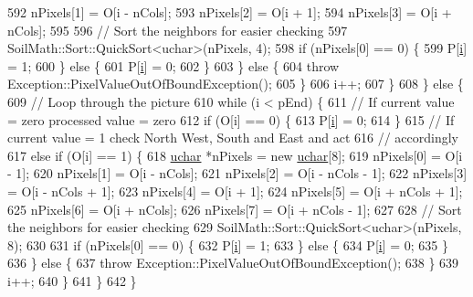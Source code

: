 \begin{DoxyCode}
592         nPixels[1] = O[i - nCols];
593         nPixels[2] = O[i + 1];
594         nPixels[3] = O[i + nCols];
595 
596         \textcolor{comment}{// Sort the neighbors for easier checking}
597         SoilMath::Sort::QuickSort<uchar>(nPixels, 4);
598         \textcolor{keywordflow}{if} (nPixels[0] == 0) \{
599           P[\hyperlink{_comparision_pictures_2_createtest_image_8m_a6f6ccfcf58b31cb6412107d9d5281426}{i}] = 1;
600         \} \textcolor{keywordflow}{else} \{
601           P[\hyperlink{_comparision_pictures_2_createtest_image_8m_a6f6ccfcf58b31cb6412107d9d5281426}{i}] = 0;
602         \}
603       \} \textcolor{keywordflow}{else} \{
604         \textcolor{keywordflow}{throw} Exception::PixelValueOutOfBoundException();
605       \}
606       i++;
607     \}
608   \} \textcolor{keywordflow}{else} \{
609     \textcolor{comment}{// Loop through the picture}
610     \textcolor{keywordflow}{while} (i < pEnd) \{
611       \textcolor{comment}{// If current value = zero processed value = zero}
612       \textcolor{keywordflow}{if} (O[i] == 0) \{
613         P[\hyperlink{_comparision_pictures_2_createtest_image_8m_a6f6ccfcf58b31cb6412107d9d5281426}{i}] = 0;
614       \}
615       \textcolor{comment}{// If current value = 1 check North West, South and East and act}
616       \textcolor{comment}{// accordingly}
617       \textcolor{keywordflow}{else} \textcolor{keywordflow}{if} (O[i] == 1) \{
618         \hyperlink{_soil_math_types_8h_a65f85814a8290f9797005d3b28e7e5fc}{uchar} *nPixels = \textcolor{keyword}{new} \hyperlink{_soil_math_types_8h_a65f85814a8290f9797005d3b28e7e5fc}{uchar}[8];
619         nPixels[0] = O[i - 1];
620         nPixels[1] = O[i - nCols];
621         nPixels[2] = O[i - nCols - 1];
622         nPixels[3] = O[i - nCols + 1];
623         nPixels[4] = O[i + 1];
624         nPixels[5] = O[i + nCols + 1];
625         nPixels[6] = O[i + nCols];
626         nPixels[7] = O[i + nCols - 1];
627 
628         \textcolor{comment}{// Sort the neighbors for easier checking}
629         SoilMath::Sort::QuickSort<uchar>(nPixels, 8);
630 
631         \textcolor{keywordflow}{if} (nPixels[0] == 0) \{
632           P[\hyperlink{_comparision_pictures_2_createtest_image_8m_a6f6ccfcf58b31cb6412107d9d5281426}{i}] = 1;
633         \} \textcolor{keywordflow}{else} \{
634           P[\hyperlink{_comparision_pictures_2_createtest_image_8m_a6f6ccfcf58b31cb6412107d9d5281426}{i}] = 0;
635         \}
636       \} \textcolor{keywordflow}{else} \{
637         \textcolor{keywordflow}{throw} Exception::PixelValueOutOfBoundException();
638       \}
639       i++;
640     \}
641   \}
642 \}
\end{DoxyCode}


